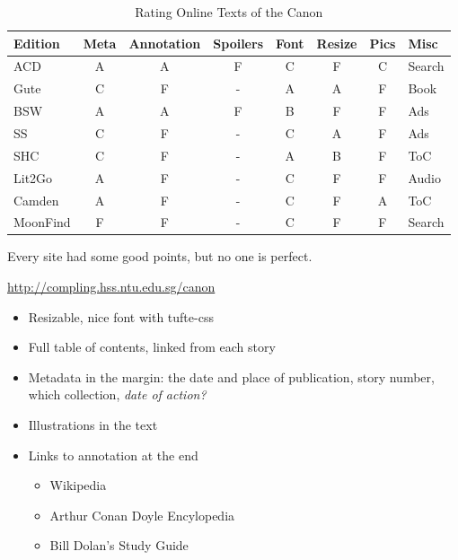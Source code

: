 \documentclass[a4paper,landscape,headrule,footrule,xetex]{foils}
\newcommand{\todo}{\marginpar{ToDo}}
\begin{document}
\begin{table}
\caption{Rating Online Texts of the Canon}
\bigskip
\label{tab:editions}
\begin{tabular}{lccccccl}
Edition & Meta & Annotation & Spoilers & Font & Resize & Pics & Misc\\
\hline
ACD    & A & A & F & C & F & C & Search\\
Gute   & C & F & - & A & A & F & Book \\
BSW    & A & A & F & B & F & F & Ads \\
SS     & C & F & - & C & A & F & Ads \\
SHC      & C & F & - & A & B & F & ToC \\
Lit2Go   & A & F & - & C & F & F & Audio \\
Camden   & A & F & - & C & F & A & ToC \\
MoonFind & F & F & - & C & F & F & Search 
\end{tabular}
\end{table}

Every site had some good points, but no one is perfect.

\begin{center}
  \url{http://compling.hss.ntu.edu.sg/canon}
\end{center}

\begin{itemize}
\item Resizable, nice font with tufte-css
\item Full table of contents, linked from each story
\item Metadata in the margin: the date and place of publication, story
  number, which collection, \textit{date of action?}
\item Illustrations in the text\todo 
\item Links to annotation at the end
  \begin{itemize}
  \item Wikipedia
  \item Arthur Conan Doyle Encylopedia
  \item Bill Dolan's Study Guide
  \end{itemize}
\end{itemize}
\end{document}
